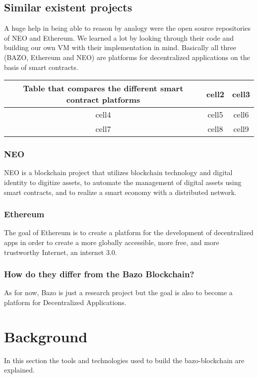 \subsection{Similar existent projects}
A huge help in being able to reason by analogy were the open source repositories of NEO and Ethereum. We learned a lot by looking through their code and building our own VM with their implementation in mind. Basically all three (BAZO, Ethereum and NEO) are platforms for decentralized applications on the basis of smart contracts. 



\begin{center}
\begin{tabular}{ |c|c|c| } 
 \hline
 Table that compares the different smart contract platforms & cell2 & cell3 \\ \hline
 cell4 & cell5 & cell6 \\ 
 cell7 & cell8 & cell9 \\ 
 \hline
\end{tabular}
\end{center}

\subsubsection{NEO}
NEO is a blockchain project \frqq that utilizes blockchain technology and digital identity to digitize assets, to automate the management of digital assets using smart contracts, and to realize a smart economy with a distributed network.\frqq \cite{neovseth}

\subsubsection{Ethereum}
The goal of Ethereum is to create a platform for the development of decentralized apps in order to create a \frqq more globally accessible, more free, and more trustworthy Internet, an internet 3.0\frqq. \cite{neovseth}

\subsubsection{How do they differ from the Bazo Blockchain?}
As for now, Bazo is just a research project but the goal is also to become a platform for Decentralized Applications.

\section{Background}
In this section the tools and technologies used to build the bazo-blockchain are explained.

